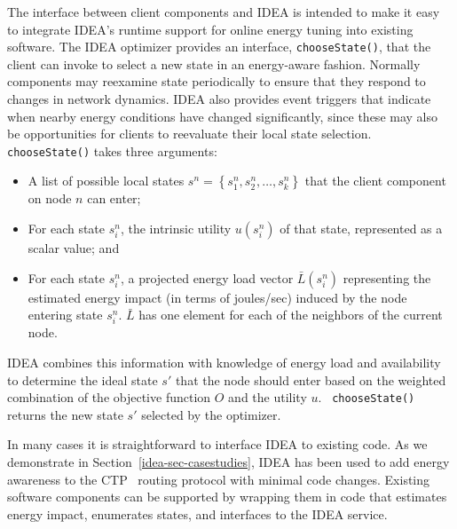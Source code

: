 The interface between client components and IDEA is intended to
make it easy to integrate IDEA's runtime support for online energy
tuning into existing software. The IDEA optimizer provides an
interface, {\tt chooseState()}, that the client can invoke to select
a new state in an energy-aware fashion. Normally components may reexamine
state periodically to ensure that they respond to changes in network
dynamics. IDEA also provides event triggers that indicate when nearby energy
conditions have changed significantly, since these may also be opportunities
for clients to reevaluate their local state selection.
{\tt chooseState()} takes three arguments:
\begin{itemize}
\item A list of possible local states $s^n = \left\{ s^n_1, s^n_2, \ldots,
s^n_k\right\}$ that the client component on node $n$ can enter;
\item For each state $s^n_i$, the intrinsic utility $u(s^n_i)$ of that state,
represented as a scalar value; and
\item For each state $s^n_i$, a projected energy load vector $\bar{L}(s^n_i)$
representing the estimated energy impact (in terms of joules/sec) induced by
the node entering state $s^n_i$. $\bar{L}$ has one element for each of the
neighbors of the current node. 
\end{itemize}
IDEA combines this information with knowledge of energy load and availability
to determine the ideal state $s'$ that the node should enter based on the
weighted combination of the objective function $O$ and the utility $u$.  {\tt
chooseState()} returns the new state $s'$ selected by the optimizer.

In many cases it is straightforward to interface IDEA to existing code. As we
demonstrate in Section~\ref{idea-sec-casestudies}, IDEA has been used to add
energy awareness to the CTP~\cite{ctp-sensys09} routing protocol with minimal
code changes.  Existing software components can be supported by wrapping them
in code that estimates energy impact, enumerates states, and interfaces to
the IDEA service.
